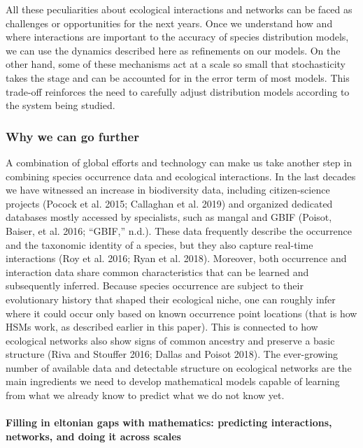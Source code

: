 \documentclass[12pt]{article}
\begin{document}
All these peculiarities about ecological interactions and networks can
be faced as challenges or opportunities for the next years. Once we
understand how and where interactions are important to the accuracy of
species distribution models, we can use the dynamics described here as
refinements on our models. On the other hand, some of these mechanisms
act at a scale so small that stochasticity takes the stage and can be
accounted for in the error term of most models. This trade-off
reinforces the need to carefully adjust distribution models according to
the system being studied.

\hypertarget{why-we-can-go-further}{%
\subsubsection{Why we can go further}\label{why-we-can-go-further}}

A combination of global efforts and technology can make us take another
step in combining species occurrence data and ecological interactions.
In the last decades we have witnessed an increase in biodiversity data,
including citizen-science projects (Pocock et al. 2015; Callaghan et al.
2019) and organized dedicated databases mostly accessed by specialists,
such as mangal and GBIF (Poisot, Baiser, et al. 2016; {``GBIF,''} n.d.).
These data frequently describe the occurrence and the taxonomic identity
of a species, but they also capture real-time interactions (Roy et al.
2016; Ryan et al. 2018). Moreover, both occurrence and interaction data
share common characteristics that can be learned and subsequently
inferred. Because species occurrence are subject to their evolutionary
history that shaped their ecological niche, one can roughly infer where
it could occur only based on known occurrence point locations (that is
how HSMs work, as described earlier in this paper). This is connected to
how ecological networks also show signs of common ancestry and preserve
a basic structure (Riva and Stouffer 2016; Dallas and Poisot 2018). The
ever-growing number of available data and detectable structure on
ecological networks are the main ingredients we need to develop
mathematical models capable of learning from what we already know to
predict what we do not know yet.

\hypertarget{filling-in-eltonian-gaps-with-mathematics-predicting-interactions-networks-and-doing-it-across-scales}{%
\paragraph{Filling in eltonian gaps with mathematics: predicting
interactions, networks, and doing it across
scales}\label{filling-in-eltonian-gaps-with-mathematics-predicting-interactions-networks-and-doing-it-across-scales}}
\end{document}
